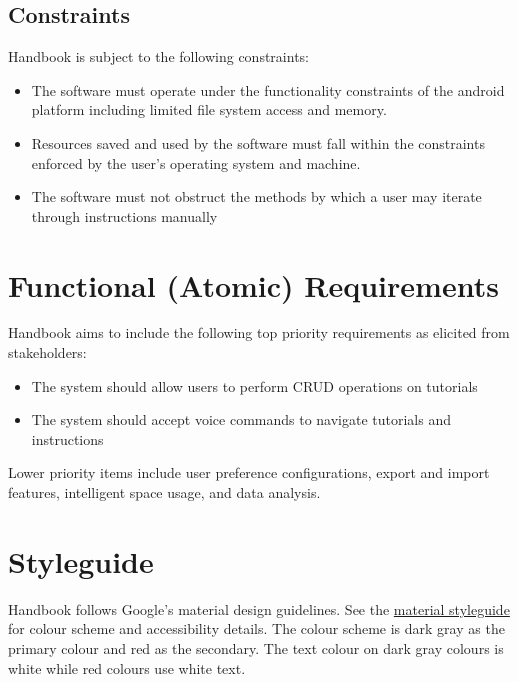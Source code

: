 \documentclass[12pt]{article}
\begin{document}
\subsection{Constraints}

Handbook is subject to the following constraints:

\begin{itemize}

\item The software must operate under the functionality constraints of the android platform including limited file system access and memory.
\item Resources saved and used by the software must fall within the constraints enforced by the user's operating system and machine.
\item The software must not obstruct the methods by which a user may iterate through instructions manually

\end{itemize}

\section{Functional (Atomic) Requirements}

Handbook aims to include the following top priority requirements as elicited from stakeholders:

\begin{itemize}[noitemsep]
\item The system should allow users to perform CRUD operations on tutorials
\item The system should accept voice commands to navigate tutorials and instructions
\end{itemize}

Lower priority items include user preference configurations, export and import features, intelligent space usage, and data analysis.

\section{Styleguide}

Handbook follows Google's material design guidelines. See the \href{https://material.io/color/#!/?view.left=1&view.right=1&primary.color=363b41&secondary.color=ad555a}{material styleguide} for colour scheme and accessibility details. The colour scheme is dark gray as the primary colour and red as the secondary. 
The text colour on dark gray colours is white while red colours use white text. 
\end{document}
